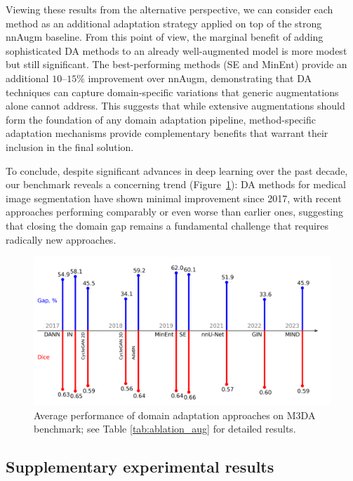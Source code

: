 Viewing these results from the alternative perspective, we can consider each method as an additional adaptation strategy applied on top of the strong nnAugm baseline. From this point of view, the marginal benefit of adding sophisticated DA methods to an already well-augmented model is more modest but still significant. The best-performing methods (SE and MinEnt) provide an additional $10$--$15\%$ improvement over nnAugm, demonstrating that DA techniques can capture domain-specific variations that generic augmentations alone cannot address. This suggests that while extensive augmentations should form the foundation of any domain adaptation pipeline, method-specific adaptation mechanisms provide complementary benefits that warrant their inclusion in the final solution.

To conclude, despite significant advances in deep learning over the past decade, our benchmark reveals a concerning trend (Figure~\ref{fig:teaser3}): DA methods for medical image segmentation have shown minimal improvement since 2017, with recent approaches performing comparably or even worse than earlier ones, suggesting that closing the domain gap remains a fundamental challenge that requires radically new approaches.

\begin{figure}
	\includegraphics[width=\linewidth]{Dissertation/Figures/4_da_bench/cvpr_m3da_methods_timeline.png}
	\caption{Average performance of domain adaptation approaches on M3DA benchmark; see Table \ref{tab:ablation_aug} for detailed results.}  %
	\label{fig:teaser3}
\end{figure}


\subsection{Supplementary experimental results}

